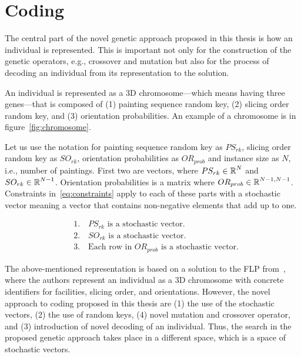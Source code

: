 \section{Coding}\label{sec:coding}

The central part of the novel genetic approach proposed in this thesis is how an individual is represented.
This is important not only for the construction of the genetic operators, e.g., crossover and mutation
but also for the process of decoding an individual from its representation to the solution.

An individual is represented as a 3D chromosome—which means having three genes—that is composed of
(1) painting sequence random key, (2) slicing order random key, and (3) orientation probabilities.
An example of a chromosome is in figure~\ref{fig:chromosome}.

Let us use the notation for painting sequence random key as $PS_{rk}$,
slicing order random key as $SO_{rk}$,
orientation probabilities as $OR_{prob}$ and instance size as $N$, i.e., number of paintings.
First two are vectors, where $PS_{rk} \in \operatorname*{\mathbb{R}}^N$ and $SO_{rk} \in \operatorname*{\mathbb{R}}^{N-1}$.
Orientation probabilities is a matrix where $OR_{prob} \in \operatorname*{\mathbb{R}}^{N-1, N-1}$.
Constraints in~\ref{eq:constraints} apply to each of these parts with
a stochastic vector meaning a vector that contains non-negative elements that add up to one.

\begin{equation}
    \begin{aligned}
        & 1. \quad PS_{rk} \text{ is a stochastic vector.} \\
        & 2. \quad SO_{rk} \text{ is a stochastic vector.} \\
        & 3. \quad \text{Each row in } OR_{prob} \text{ is a stochastic vector.}
    \end{aligned}\label{eq:constraints}
\end{equation}


The above-mentioned representation is based on a solution to the FLP
from~\cite{friedrichIntegratedSlicingTree2018, riponAdaptiveVariableNeighborhood2013},
where the authors represent an individual as a 3D chromosome with concrete identifiers for facilities, slicing order, and orientations.
However, the novel approach to coding proposed in this thesis are (1) the use of the stochastic vectors, (2) the use of random keys, (4) novel mutation and crossover operator, and
(3) introduction of novel decoding of an individual.
Thus, the search in the proposed genetic approach takes place in a different space, which is a space of stochastic vectors.

